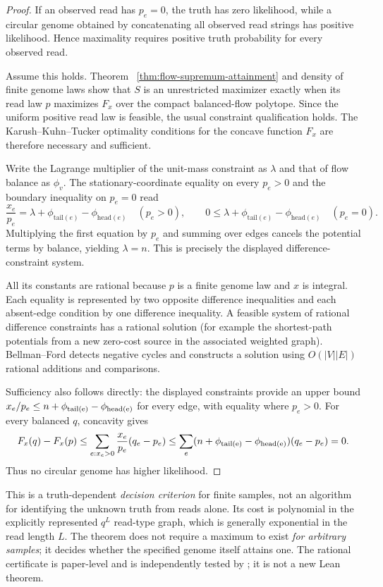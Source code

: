 \begin{proof}
If an observed read has $p_e=0$, the truth has
zero likelihood, while a circular genome obtained
by concatenating all observed read strings has
positive likelihood. Hence maximality requires
positive truth probability for every observed read.

Assume this holds. Theorem~
\ref{thm:flow-supremum-attainment} and density of
finite genome laws show that $S$ is an unrestricted
maximizer exactly when its read law $p$ maximizes
$F_x$ over the compact balanced-flow polytope.
Since the uniform positive read law is feasible,
the usual constraint qualification holds. The
Karush--Kuhn--Tucker optimality conditions
for the concave function $F_x$ are therefore
necessary and sufficient.

Write the Lagrange multiplier of the unit-mass
constraint as $\lambda$ and that of flow balance
as $\phi_v$. The stationary-coordinate equality on
every $p_e>0$ and the boundary inequality on
$p_e=0$ read
\[
  \frac{x_e}{p_e}
    =\lambda+\phi_{\mathrm{tail}(e)}
                     -\phi_{\mathrm{head}(e)}
       \quad(p_e>0),
 \qquad
 0\le\lambda+\phi_{\mathrm{tail}(e)}
                     -\phi_{\mathrm{head}(e)}
       \quad(p_e=0).
\]
Multiplying the first equation by $p_e$ and
summing over edges cancels the potential terms
by balance, yielding $\lambda=n$. This is
precisely the displayed difference-constraint
system.

All its constants are rational because $p$ is
a finite genome law and $x$ is integral.
Each equality is represented by two opposite
difference inequalities and each absent-edge
condition by one difference inequality.
A feasible system of rational difference
constraints has a rational solution (for example
the shortest-path potentials from a new zero-cost
source in the associated weighted graph).
Bellman--Ford detects negative cycles and
constructs a solution using $O(|V||E|)$
rational additions and comparisons.

Sufficiency also follows directly: the displayed
constraints provide an upper bound
$x_e/p_e\le n+\phi_{\rm tail(e)}-\phi_{\rm head(e)}$
for every edge, with equality where $p_e>0$.
For every balanced $q$, concavity gives
\[
 F_x(q)-F_x(p)
 \le \sum_{e:x_e>0}\frac{x_e}{p_e}(q_e-p_e)
 \le \sum_e(n+\phi_{\rm tail(e)}
                 -\phi_{\rm head(e)})(q_e-p_e)=0.
\]
Thus no circular genome has higher likelihood.
\end{proof}

This is a truth-dependent \emph{decision criterion}
for finite samples, not an algorithm for identifying
the unknown truth from reads alone. Its cost is
polynomial in the explicitly represented $q^L$
read-type graph, which is generally exponential
in the read length $L$. The theorem does not
require a maximum to exist \emph{for arbitrary
samples}; it decides whether the specified
genome itself attains one.
The rational certificate is paper-level and is
independently tested by
;
it is not a new Lean theorem.

